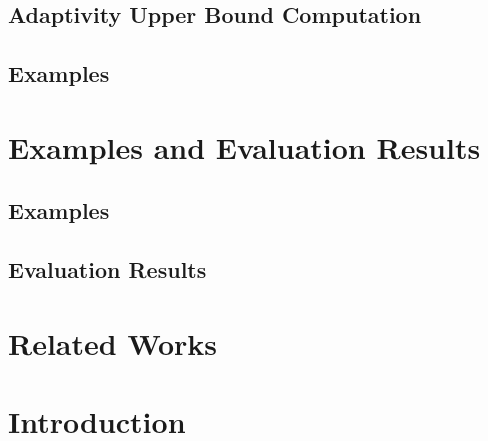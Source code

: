 \documentclass[12pt, letterpaper]{report}   %
\begin{document}
\section{Adaptivity Upper Bound Computation}
\label{sec:alg_adaptcompute}


\section{Examples}
\label{sec:static-examples}



\clearpage
\chapter{Examples and Evaluation Results}
\label{sec:adapt-implementation}
\section{Examples}
\label{sec:adapt-example}

\section{Evaluation Results}
\label{sec:adapt-eval}


\chapter{Related Works}
\label{sec:adapt-relatedwork}






\chapter*{}

\chapter{Introduction}
\label{sec:reachability-intro}
\end{document}
